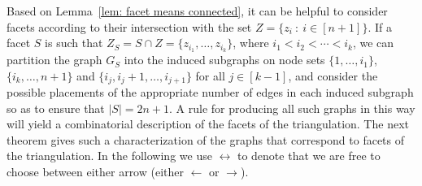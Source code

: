 \documentclass[11pt]{article}
\theoremstyle{definition}
\numberwithin{equation}{section}
\begin{document}
Based on Lemma~\ref{lem: facet means connected}, it can be helpful to consider facets according to their intersection with the set $Z = \{z_i~ :~ i\in[n+1]\}$.  
If a facet $S$ is such that $Z_S = S\cap Z = \{z_{i_1},\ldots, z_{i_k}\}$, where $i_1<i_2<\cdots<i_k$, we can partition the graph $G_S$ into the induced subgraphs on node sets $\{1,\ldots, i_1\}$, $\{i_k,\ldots, n+1\}$ and $\{i_j, i_j+1,\ldots, i_{j+1}\}$ for all $j\in[k-1]$, and consider the possible placements of the appropriate number of edges in each induced subgraph so as to ensure that $|S| = 2n+1$.  
A rule for producing all such graphs in this way will yield a combinatorial description of the facets of the triangulation. 
The next theorem gives such a characterization of the graphs that correspond to facets of the triangulation.
In the following we use $\leftrightarrow$ to denote that we are free to choose between either arrow (either $\leftarrow$ or $\rightarrow$). 
\end{document}
